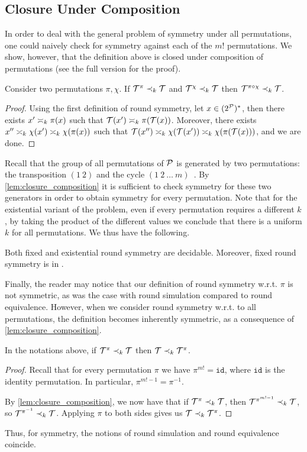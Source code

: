 \subsection*{Closure Under Composition}
In order to deal with the general problem of symmetry under all permutations, one could naively check for symmetry against each of the $m!$ permutations. We show, however, that the definition above is closed under composition of permutations (see the full version for the proof). 
\begin{lemma}
    \label{lem:closure_composition}
    Consider two permutations $\pi,\chi$. If $\cT^\pi\prec_k \cT$ and $\cT^\chi \prec_k \cT$ then $\cT^{\pi\circ \chi} \prec_k \cT$.
\end{lemma}
\begin{proof}
    Using the first definition of round symmetry, let $x\in (2^{\cP})^*$, then there exists $x'\req[k] \pi(x)$ such that $\cT(x')\req[k] \pi(\cT(x))$. Moreover, there exists $x''\req[k] \chi(x') \req[k] \chi(\pi(x))$ such that $\cT(x'')\req[k] \chi(\cT(x'))\req[k] \chi(\pi(\cT(x)))$, and we are done.
\end{proof}

Recall that the group of all permutations of $\cP$ is generated by two permutations: the transposition $(1\ 2)$ and the cycle $(1\ 2\ \ldots\ m)$~\cite{Cameron1999}. By \autoref{lem:closure_composition} it is sufficient to check symmetry for these two generators in order to obtain symmetry for every permutation. Note that for the existential variant of the problem, even if every permutation requires a different $k$, by taking the product of the different values we conclude that there is a uniform $k$ for all permutations.
We thus have the following.
\begin{theorem}
\label{thm:symmetry_decidable}
Both fixed and existential round symmetry are decidable. Moreover, fixed round symmetry is in \PSPACE.
\end{theorem}

Finally, the reader may notice that our definition of round symmetry w.r.t. $\pi$ is not symmetric, as was the case with round simulation compared to round equivalence. However, when we consider round symmetry w.r.t. to all permutations, the definition becomes inherently symmetric, as a consequence of \autoref{lem:closure_composition}.
\begin{lemma}
\label{lem:round_symmetry_commutative}
    In the notations above, if $\cT^{\pi}\prec_k \cT$ then $\cT\prec_k \cT^\pi$.
\end{lemma}
\begin{proof}
    Recall that for every permutation $\pi$ we have $\pi^{m!}=\mathtt{id}$, where $\mathtt{id}$ is the identity permutation. In particular, $\pi^{m!-1}=\pi^{-1}$. 

    By \autoref{lem:closure_composition}, we now have that if $\cT^{\pi}\prec_k \cT$, then $\cT^{\pi^{m!-1}}\prec_k \cT$, so $\cT^{\pi^{-1}}\prec_k \cT$. Applying $\pi$ to both sides gives us $\cT\prec_k \cT^{\pi}$.
\end{proof}

Thus, for symmetry, the notions of round simulation and round equivalence coincide.
